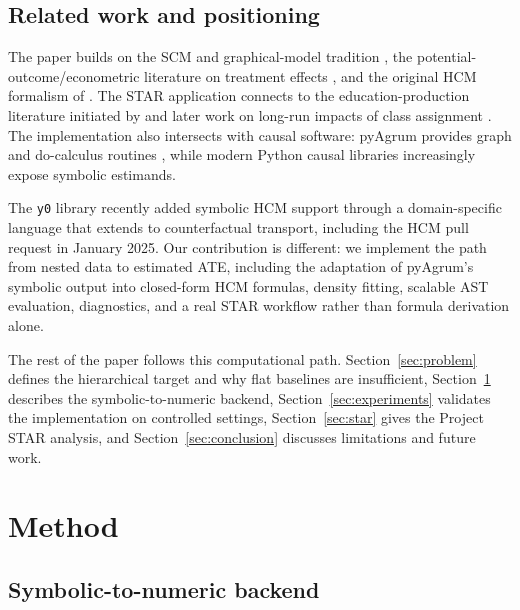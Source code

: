 \documentclass[unnumsec,webpdf,contemporary,large]{oup-authoring-template}%
\theoremstyle{thmstyleone}%
\theoremstyle{thmstyletwo}%
\theoremstyle{thmstylethree}%
\begin{document}
\subsection{Related work and positioning}

The paper builds on the SCM and graphical-model tradition \citep{Pearl2009}, the potential-outcome/econometric literature on treatment effects \citep{Imbens2015,Angrist1996}, and the original HCM formalism of \citet{weinstein2023hcm}.
The STAR application connects to the education-production literature initiated by \citet{Krueger1999} and later work on long-run impacts of class assignment \citep{Krueger2001,Chetty2011}.
The implementation also intersects with causal software: pyAgrum provides graph and do-calculus routines \citep{pyagrum}, while modern Python causal libraries increasingly expose symbolic estimands.

The \texttt{y0} library recently added symbolic HCM support through a domain-specific language that extends to counterfactual transport, including the HCM pull request in January 2025.
Our contribution is different: we implement the path from nested data to estimated ATE, including the adaptation of pyAgrum's symbolic output into closed-form HCM formulas, density fitting, scalable AST evaluation, diagnostics, and a real STAR workflow rather than formula derivation alone.

The rest of the paper follows this computational path.
Section~\ref{sec:problem} defines the hierarchical target and why flat baselines are insufficient, Section~\ref{sec:method} describes the symbolic-to-numeric backend, Section~\ref{sec:experiments} validates the implementation on controlled settings, Section~\ref{sec:star} gives the Project STAR analysis, and Section~\ref{sec:conclusion} discusses limitations and future work.

\section{Method}
\label{sec:method}

\subsection{Symbolic-to-numeric backend}
\end{document}

